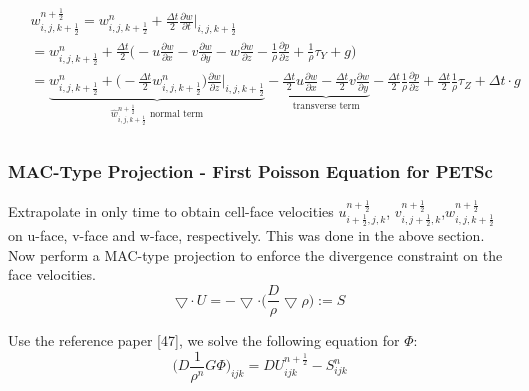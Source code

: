 \documentclass{article}
\numberwithin{equation}{subsection}
\begin{document}
\begin{align}
\begin{split}
& w_{i,j,k+\frac{1}{2}}^{n+\frac{1}{2}} = w_{i,j,k+\frac{1}{2}}^n + \frac{\Delta t}{2}\frac{\partial w}{\partial t}|_{i,j,k+\frac{1}{2}}\\
& = w_{i,j,k+\frac{1}{2}}^n + \frac{\Delta t}{2} \Big( -u\frac{\partial w}{\partial x} -v\frac{\partial w}{\partial y} -w\frac{\partial w}{\partial z} - \frac{1}{\rho}\frac{\partial p}{\partial z} + \frac{1}{\rho}\tau_Y + g\Big) \\
& = \underbrace{w_{i,j,k+\frac{1}{2}}^n + \Big( - \frac{\Delta t}{2} w_{i,j,k+\frac{1}{2}}^n\Big)\frac{\partial w}{\partial z}|_{i,j,k+\frac{1}{2}}}_\text{$\widehat{w}_{i,j,k+\frac{1}{2}}^{n+\frac{1}{2}}$ normal term} -\underbrace{\frac{\Delta t}{2}u\frac{\partial w}{\partial x} - \frac{\Delta t}{2}v\frac{\partial w}{\partial y}}_\text{transverse term} - \frac{\Delta t}{2}\frac{1}{\rho}\frac{\partial p}{\partial z} + \frac{\Delta t}{2}\frac{1}{\rho}\tau_Z + \Delta t \cdot g \\
\end{split}
\end{align}



\subsubsection{MAC-Type Projection - First Poisson Equation for PETSc}
Extrapolate in only time to obtain cell-face velocities $u^{n+\frac{1}{2}}_{i+\frac{1}{2},j,k}$, $v^{n+\frac{1}{2}}_{i,j+\frac{1}{2},k}$,$w^{n+\frac{1}{2}}_{i,j,k+\frac{1}{2}}$ on u-face, v-face and w-face, respectively. This was done in the above section. Now perform a MAC-type projection to enforce the divergence constraint on the face velocities.
\begin{equation}
    \bigtriangledown \cdot U = - \bigtriangledown \cdot \Big( \frac{D}{\rho}\bigtriangledown \rho\Big) := S
\end{equation}

Use the reference paper [47], we solve the following equation for $\Phi$:
\begin{equation}
\Big( D \frac{1}{\rho ^n} G \Phi \Big)_{ijk} = D U^{n+\frac{1}{2}}_{ijk} -S^n_{ijk}
\end{equation}
\end{document}
